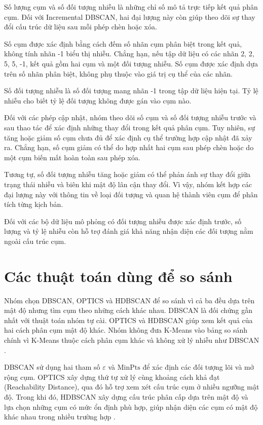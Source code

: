 Số lượng cụm và số đối tượng nhiễu là những chỉ số mô tả trực tiếp kết quả phân cụm. Đối với Incremental DBSCAN, hai đại lượng này còn giúp theo dõi sự thay đổi cấu trúc dữ liệu sau mỗi phép chèn hoặc xóa.

Số cụm được xác định bằng cách đếm số nhãn cụm phân biệt trong kết quả, không tính nhãn -1 biểu thị nhiễu. Chẳng hạn, nếu tập dữ liệu có các nhãn {2, 2, 5, 5, -1}, kết quả gồm hai cụm và một đối tượng nhiễu. Số cụm được xác định dựa trên số nhãn phân biệt, không phụ thuộc vào giá trị cụ thể của các nhãn.

Số đối tượng nhiễu là số đối tượng mang nhãn -1 trong tập dữ liệu hiện tại. Tỷ lệ nhiễu cho biết tỷ lệ đối tượng không được gán vào cụm nào.

Đối với các phép cập nhật, nhóm theo dõi số cụm và số đối tượng nhiễu trước và sau thao tác để xác định những thay đổi trong kết quả phân cụm. Tuy nhiên, sự tăng hoặc giảm số cụm chưa đủ để xác định cụ thể trường hợp cập nhật đã xảy ra. Chẳng hạn, số cụm giảm có thể do hợp nhất hai cụm sau phép chèn hoặc do một cụm biến mất hoàn toàn sau phép xóa.

Tương tự, số đối tượng nhiễu tăng hoặc giảm có thể phản ánh sự thay đổi giữa trạng thái nhiễu và biên khi mật độ lân cận thay đổi. Vì vậy, nhóm kết hợp các đại lượng này với thông tin về loại đối tượng và quan hệ thành viên cụm để phân tích từng kịch bản.

Đối với các bộ dữ liệu mô phỏng có đối tượng nhiễu được xác định trước, số lượng và tỷ lệ nhiễu còn hỗ trợ đánh giá khả năng nhận diện các đối tượng nằm ngoài cấu trúc cụm.

\section{Các thuật toán dùng để so sánh}

Nhóm chọn DBSCAN, OPTICS và HDBSCAN để so sánh vì cả ba đều dựa trên mật độ nhưng tìm cụm theo những cách khác nhau. DBSCAN là đối chứng gần nhất với thuật toán nhóm tự cài. OPTICS và HDBSCAN giúp xem kết quả của hai cách phân cụm mật độ khác. Nhóm không đưa K-Means vào bảng so sánh chính vì K-Means thuộc cách phân cụm khác và không xử lý nhiễu như DBSCAN \parencite{ester1996dbscan,ankerst1999optics,campello2013hdbscan,sklearnClusteringGuide}.

DBSCAN sử dụng hai tham số \(\varepsilon\) và \(\mathrm{MinPts}\) để xác định các đối tượng lõi và mở rộng cụm. OPTICS xây dựng thứ tự xử lý cùng khoảng cách khả đạt (Reachability Distance), qua đó hỗ trợ xem xét cấu trúc cụm ở nhiều ngưỡng mật độ. Trong khi đó, HDBSCAN xây dựng cấu trúc phân cấp dựa trên mật độ và lựa chọn những cụm có mức ổn định phù hợp, giúp nhận diện các cụm có mật độ khác nhau trong nhiều trường hợp \parencite{ankerst1999optics,campello2013hdbscan,sklearnClusteringGuide}.

